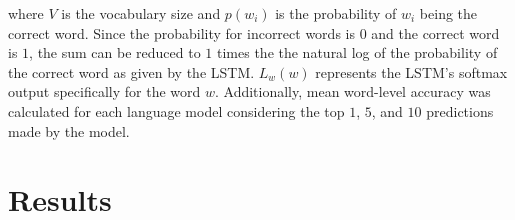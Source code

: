 \documentclass[runningheads,a4paper]{llncs}
\begin{document}
where $V$ is the vocabulary size and $p(w_i)$ is the probability of
$w_i$ being the correct word. Since the probability for incorrect
words is $0$ and the correct word is $1$, the sum can be reduced to
$1$ times the the natural log of the probability of the correct word
as given by the LSTM.
$L_w(w)$ represents the LSTM's softmax output specifically for the
word $w$. Additionally, mean word-level accuracy was calculated for
each language model considering the top $1$, $5$, and $10$ predictions
made by the model.

\section{Results}

\end{document}
